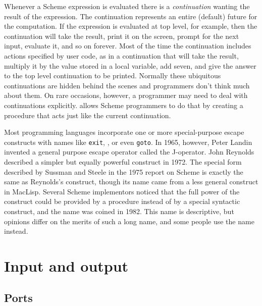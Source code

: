 \begin{entry}{%
}
\begin{rationale}
\vest Whenever a Scheme expression is evaluated there is a {\em continuation}
wanting the result of the expression.  The continuation represents an
entire (default) future for the computation.  If the expression is
evaluated at top level, for example, then the continuation will take the
result, print it on the screen, prompt for the next input, evaluate it, and
so on forever.  Most of the time the continuation includes actions
specified by user code, as in a continuation that will take the result,
multiply it by the value stored in a local variable, add seven, and give
the answer to the top level continuation to be printed.  Normally these
ubiquitous continuations are hidden behind the scenes and programmers don't
think much about them.  On rare occasions, however, a programmer may
need to deal with continuations explicitly.
 allows Scheme programmers to do
that by creating a procedure that acts just like the current
continuation.

\vest Most programming languages incorporate one or more special-purpose
escape constructs with names like {\tt exit}, \hbox{}, or
even {\tt goto}.  In 1965, however, Peter Landin~\cite{Landin65}
invented a general purpose escape operator called the J-operator.  John
Reynolds~\cite{Reynolds72} described a simpler but equally powerful
construct in 1972.  The  special form described by Sussman
and Steele in the 1975 report on Scheme is exactly the same as
Reynolds's construct, though its name came from a less general construct
in MacLisp.  Several Scheme implementors noticed that the full power of the
 construct could be provided by a procedure instead of by a
special syntactic construct, and the name
 was coined in 1982.  This name is
descriptive, but opinions differ on the merits of such a long name, and
some people use the name  instead.
\end{rationale}

\end{entry}


\section{Input and output}

\subsection{Ports}
\label{portsection}

